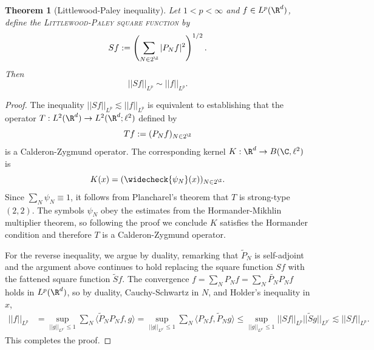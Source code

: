 \documentclass[reqno]{amsart}
\newtheorem{theorem}{Theorem}
\theoremstyle{definition}
\theoremstyle{remark}
\renewcommand{\emph}{\textsc}
\begin{document}
\begin{theorem}[Littlewood-Paley inequality]
	Let $1 < p < \infty$ and $f \in L^p (\R^d)$, define the \emph{Littlewood-Paley square function} by 
	\[ Sf := \left( \sum_{N \in 2^\Z} |P_N f|^2 \right)^{1/2}. \]
	Then 
		\[ ||S f||_{L^p} \sim ||f||_{L^p}. \]
\end{theorem}

\begin{proof}
	The inequality $||Sf||_{L^p} \lesssim ||f||_{L^p}$ is equivalent to establishing that the operator $T: L^2 (\R^d) \to L^2 (\R^d ; \ell^2)$ defined by 
		\[ Tf := ( P_N f )_{N \in 2^\Z}  \]
	is a Calderon-Zygmund operator. The corresponding kernel $K: \R^d \to B(\C, \ell^2)$ is
		\[ K(x) = (\widecheck{\psi_N} (x))_{N \in 2^\Z}. \]
	Since $\sum_N \psi_N \equiv 1$, it follows from Plancharel's theorem that $T$ is strong-type $(2, 2)$. The symbols $\psi_N$ obey the estimates from the Hormander-Mikhlin multiplier theorem, so following the proof we conclude $K$ satisfies the Hormander condition and therefore $T$ is a Calderon-Zygmund operator. 
	
	For the reverse inequality, we argue by duality, remarking that $\widetilde P_N$ is self-adjoint and the argument above continues to hold replacing the square function $Sf$ with the fattened square function $\widetilde S f$. The convergence $f = \sum_N P_N f = \sum_N \widetilde{P_N} P_N f$ holds in $L^p (\R^d)$, so by duality, Cauchy-Schwartz in $N$, and Holder's inequality in $x$, 
		\begin{align*}
			||f||_{L^p}
				&=\sup_{||g||_{L^{p'}  } \leq 1} \sum_N\langle  \widetilde P_N P_N f, g \rangle = \sup_{||g||_{L^{p'}  } \leq 1} \sum_N \langle P_N f, \widetilde P_N  g \rangle \leq \sup_{||g||_{L^{p'}  } \leq 1} ||S f||_{L^p} ||\widetilde S g||_{L^{p'}} \lesssim ||Sf||_{L^p}.
		\end{align*}
	This completes the proof. 	
\end{proof}
\end{document}

